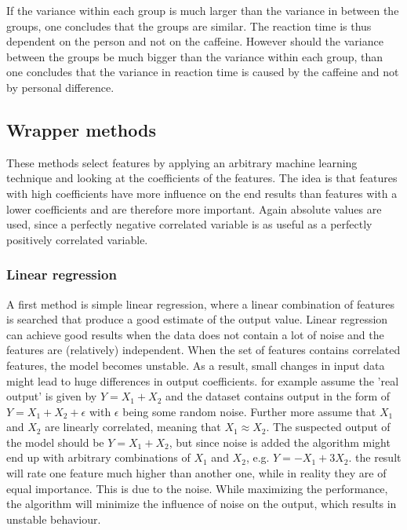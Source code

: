 \npar

If the variance within each group is much larger than the variance in between the groups, one concludes that the groups are similar. The reaction time is thus dependent on the person and not on the caffeine. However should the variance between the groups be much bigger than the variance within each group, than one concludes that the variance in reaction time is caused by the caffeine and not by personal difference.

\subsection{Wrapper methods}
These methods select features by applying an arbitrary machine learning technique and looking at the coefficients of the features. The idea is that features with high coefficients have more influence on the end results than features with a lower coefficients and are therefore more important. Again absolute values are used, since a perfectly negative correlated variable is as useful as a perfectly positively correlated variable.

\subsubsection{Linear regression}
\label{LRBad}

A first method is simple linear regression, where a linear combination of features is searched that produce a good estimate of the output value. Linear regression can achieve good results when the data does not contain a lot of noise and the features are (relatively) independent. When the set of features contains correlated features, the model becomes unstable. As a result, small changes in input data might lead to huge differences in output coefficients. for example assume the 'real output' is given by $Y = X_1 + X_2$ and the dataset contains output in the form of $Y = X_1 + X_2 + \epsilon$ with $\epsilon$ being some random noise. Further more assume that $X_1$ and $X_2$ are linearly correlated, meaning that $X_1 \approx X_2$. The suspected output of the model should be $Y = X_1 + X_2$, but since noise is added the algorithm might end up with arbitrary combinations of $X_1$ and $X_2$, e.g. $Y = -X_1 + 3X_2$. the result will rate one feature much higher than another one, while in reality they are of equal importance. This is due to the noise. While maximizing the performance, the algorithm will minimize the influence of noise on the output, which results in unstable behaviour.

